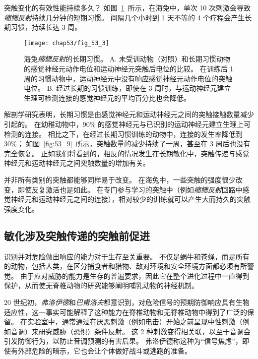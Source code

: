 突触变化的有效性能持续多久？
如图~\ref{fig:53_3}~所示，在海兔中，单次 10 次刺激会导致\textit{缩鳃反射}持续几分钟的短期习惯。
间隔几个小时到 1 天不等的 4 个疗程会产生长期习惯，持续长达 3 周。


\begin{figure}[htbp]
	\centering
	\texttt{[image: chap53/fig\_53\_3]}
	\caption{海兔\textit{缩鳃反射}的长期习惯\cite{castellucci1978cellular}。
		A. 未受训动物（对照）和长期习惯动物的感觉神经元动作电位和运动神经元突触后电位的比较。
		在训练后 1 周的习惯动物中，运动神经元中没有响应感觉神经元动作电位的突触电位。
		B. 经过长期的习惯训练，即使在 3 周时，与运动神经元建立生理可检测连接的感觉神经元的平均百分比也会降低。}
	\label{fig:53_3}
\end{figure}


解剖学研究表明，长期习惯是由感觉神经元和运动神经元之间的突触接触数量减少引起的。
在幼稚动物中，90\% 的感觉神经元与已识别的运动神经元建立生理上可检测的连接。
相比之下，在经过长期习惯训练的动物中，连接的发生率降低到 30\%；
如图~\ref{fig:53_9}~所示，突触数量的减少持续了一周，甚至在 3 周后也没有完全恢复。
正如我们将看到的，相反的情况发生在长期敏化中，突触传递与感觉神经元和运动神经元之间突触数量的增加有关。


并非所有类别的突触都能够同样易于改变。
在海兔中，一些突触的强度很少改变，即使反复激活也是如此。
在专门参与学习的突触中（例如\textit{缩鳃反射}回路中感觉神经元和运动神经元之间的连接），相对较少的训练就可以产生大而持久的突触强度变化。




\subsection{敏化涉及突触传递的突触前促进}

识别并对危险做出响应的能力对于生存至关重要。
不仅是蜗牛和苍蝇，而是所有的动物，包括人类，在区分捕食者和猎物、敌对环境和安全环境方面都必须有所警觉。
由于应对威胁的能力是生存的普遍要求，因此它在整个进化过程中一直得到保护，从而使无脊椎动物的研究能够阐明哺乳动物的神经机制。


20 世纪初，\textit{弗洛伊德}和\textit{巴甫洛夫}都意识到，对危险信号的预期防御响应具有生物适应性，这一事实可能解释了这种能力在脊椎动物和无脊椎动物中得到了广泛的保留。
在实验室中，通常通过在厌恶刺激（例如电击）开始之前呈现中性刺激（例如音调）来研究威胁（恐惧）条件反射。
这 2 种刺激变得相关联，以至于音调会引发防御行为，以防止音调预测的有害后果。
弗洛伊德称这种为“信号焦虑”，即使有外部危险的暗示，它也会让个体做好战斗或逃跑的准备。


